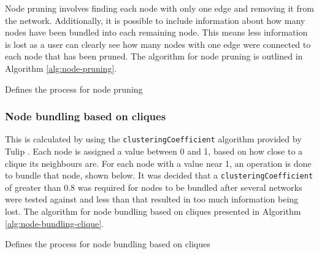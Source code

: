 \documentclass[../dissertation.tex]{subfiles}
\begin{document}
Node pruning involves finding each node with only one edge and removing it from the network. Additionally, it is possible to include information about how many nodes have been bundled into each remaining node. This means less information is lost as a user can clearly see how many nodes with one edge were connected to each node that has been pruned. The algorithm for node pruning is outlined in Algorithm \ref{alg:node-pruning}.

\begin{algorithm}[H]
\caption{Defines the process for node pruning}
\label{alg:node-pruning}
\begin{algorithmic}
 
    \ENDIF 
\ENDFOR
{} 
\ENDFOR
\end{algorithmic}
\end{algorithm}

\subsubsection{Node bundling based on cliques}
\label{sec:impl-node-clique}

This is calculated by using the \texttt{clusteringCoefficient} algorithm provided by Tulip \cite{tulip-clustering-coeff-doc}. Each node is assigned a value between 0 and 1, based on how close to a clique its neighbours are. For each node with a value near 1, an operation is done to bundle that node, shown below. It was decided that a \texttt{clusteringCoefficient} of greater than 0.8 was required for nodes to be bundled after several networks were tested against and less than that resulted in too much information being lost. The algorithm for node bundling based on cliques presented in Algorithm \ref{alg:node-bundling-clique}.

\begin{algorithm}[H]
\caption{Defines the process for node bundling based on cliques}
\label{alg:node-bundling-clique}
\begin{algorithmic}
 
 
    \ENDIF
\ENDFOR
{}
      
\ENDFOR

\end{algorithmic}
\end{algorithm}
\end{document}

